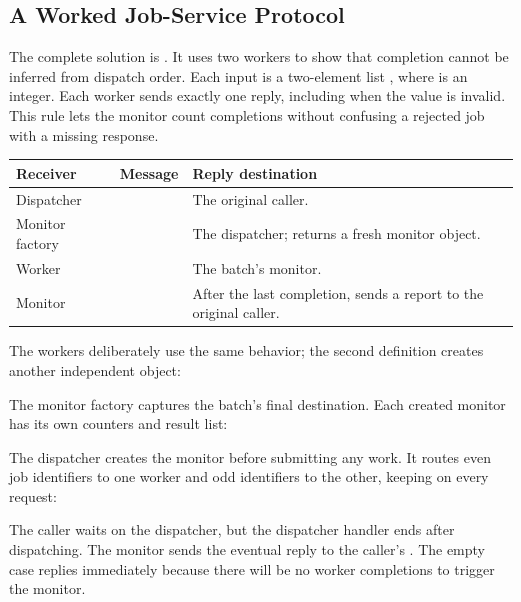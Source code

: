 \subsection{A Worked Job-Service Protocol}

The complete solution is .
It uses two workers to show that completion cannot be inferred from
dispatch order. Each input is a two-element list \code{[id value]},
where  is an integer. Each worker sends exactly one
 reply, including when the value is invalid.
This rule lets the monitor count completions without confusing a rejected
job with a missing response.

\noindent\begin{minipage}{\linewidth}
\begin{tabular}{L{0.24\textwidth}L{0.40\textwidth}L{0.26\textwidth}}
\textbf{Receiver} & \textbf{Message} & \textbf{Reply destination}\\\hline
Dispatcher &  & The original caller.\\
Monitor factory &  & The dispatcher;
returns a fresh monitor object.\\
Worker &  & The batch's monitor.\\
Monitor &  & After the last completion,
sends a report to the original caller.\\
\end{tabular}
\end{minipage}

The workers deliberately use the same behavior; the second definition
creates another independent object:


The monitor factory captures the batch's final destination.
Each created monitor has its own counters and result list:


The dispatcher creates the monitor before submitting any work.
It routes even job identifiers to one worker and odd identifiers
to the other, keeping  on every request:


The caller waits on the dispatcher, but the dispatcher handler ends after
dispatching. The monitor sends the eventual reply to the caller's .
The empty case replies immediately because there will be no worker
completions to trigger the monitor.

